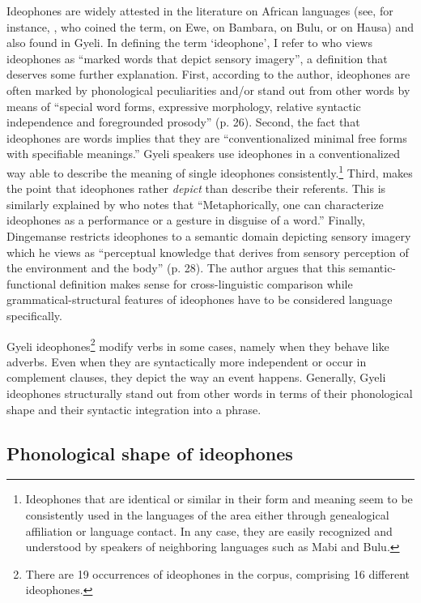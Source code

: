 Ideophones are widely attested in the literature on African languages (see, for instance, \citet{doke1935}, who coined the term, \citet{westermann07} on Ewe, \citet{dumestre98} on Bambara, \citet{alexandre66} on Bulu, or  \citet{newman2001} on Hausa) and also found in Gyeli.  In defining the term `ideophone', I refer to \citet[25]{dingemanse2011} who views ideophones as ``marked words that depict sensory imagery'', a definition that deserves some further explanation. First, according to the author, ideophones are often marked by phonological peculiarities and/or stand out from other words by means of ``special word forms, expressive morphology, relative syntactic independence and foregrounded prosody'' (p. 26). Second, the fact that ideophones are words implies that they are ``conventionalized minimal free forms with specifiable meanings.'' Gyeli speakers use ideophones in a conventionalized way able to describe the meaning of single ideophones consistently.\footnote{Ideophones that are identical or similar in their form and meaning seem to be consistently used in the languages of the area either through genealogical affiliation or language contact. In any case, they are easily recognized and understood by speakers of neighboring languages such as Mabi and Bulu.} Third, \citet[27]{dingemanse2011} makes the point that ideophones rather {\itshape depict} than describe their referents. This is similarly explained by \citet[280]{guldemann2008} who notes that ``Metaphorically, one can characterize ideophones as a performance or a gesture in disguise of a word.''
Finally, Dingemanse restricts ideophones to a semantic domain depicting sensory imagery which he views as ``perceptual knowledge that derives from sensory perception of the environment and the body'' (p. 28).
The author argues that this semantic-functional definition makes sense for cross-linguistic comparison while grammatical-structural features of ideophones have to be considered language specifically.  

Gyeli ideophones\footnote{There are 19 occurrences of ideophones in the corpus, comprising 16 different ideophones.} modify verbs in some cases, namely when they behave like adverbs. Even when they are syntactically more independent or occur in  complement clauses, they depict the way an event happens.
Generally, Gyeli ideophones structurally stand out from other words in terms of their phonological shape and their syntactic integration into a phrase.

\subsection{Phonological shape of ideophones} 
\label{sec:IDEOphon}

